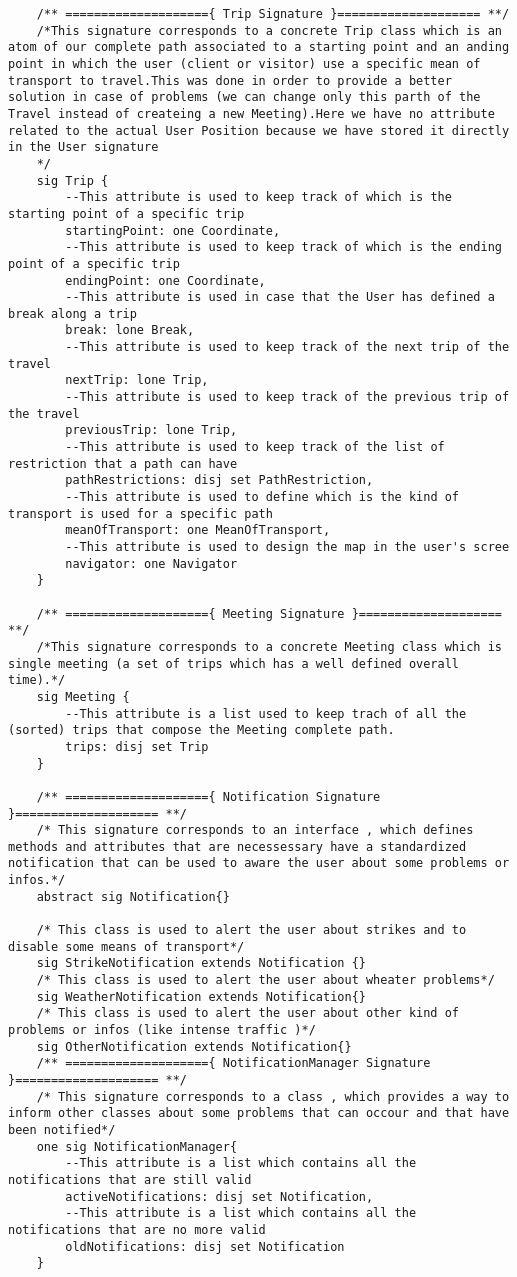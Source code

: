 \documentclass[a4paper,leqno]{book}
\begin{document}
\begin{lstlisting}
	/** ===================={ Trip Signature }==================== **/
	/*This signature corresponds to a concrete Trip class which is an atom of our complete path associated to a starting point and an anding point in which the user (client or visitor) use a specific mean of transport to travel.This was done in order to provide a better solution in case of problems (we can change only this parth of the Travel instead of createing a new Meeting).Here we have no attribute related to the actual User Position because we have stored it directly in the User signature
	*/
	sig Trip {
		--This attribute is used to keep track of which is the starting point of a specific trip
		startingPoint: one Coordinate,
		--This attribute is used to keep track of which is the ending point of a specific trip
		endingPoint: one Coordinate,
		--This attribute is used in case that the User has defined a break along a trip
		break: lone Break,
		--This attribute is used to keep track of the next trip of the travel
		nextTrip: lone Trip,
		--This attribute is used to keep track of the previous trip of the travel
		previousTrip: lone Trip,
		--This attribute is used to keep track of the list of restriction that a path can have
		pathRestrictions: disj set PathRestriction,
		--This attribute is used to define which is the kind of transport is used for a specific path
		meanOfTransport: one MeanOfTransport,
		--This attribute is used to design the map in the user's scree
		navigator: one Navigator
	}
	
	/** ===================={ Meeting Signature }==================== **/
	/*This signature corresponds to a concrete Meeting class which is single meeting (a set of trips which has a well defined overall time).*/
	sig Meeting {
		--This attribute is a list used to keep trach of all the (sorted) trips that compose the Meeting complete path.
		trips: disj set Trip
	}
	
	/** ===================={ Notification Signature }==================== **/
	/* This signature corresponds to an interface , which defines methods and attributes that are necessessary have a standardized notification that can be used to aware the user about some problems or infos.*/
	abstract sig Notification{}
	
	/* This class is used to alert the user about strikes and to disable some means of transport*/
	sig StrikeNotification extends Notification {}
	/* This class is used to alert the user about wheater problems*/
	sig WeatherNotification extends Notification{}
	/* This class is used to alert the user about other kind of problems or infos (like intense traffic )*/
	sig OtherNotification extends Notification{}
	/** ===================={ NotificationManager Signature }==================== **/
	/* This signature corresponds to a class , which provides a way to inform other classes about some problems that can occour and that have been notified*/
	one sig NotificationManager{
		--This attribute is a list which contains all the notifications that are still valid
		activeNotifications: disj set Notification,
		--This attribute is a list which contains all the notifications that are no more valid
		oldNotifications: disj set Notification
	}
	

\end{lstlisting}
\end{document}
